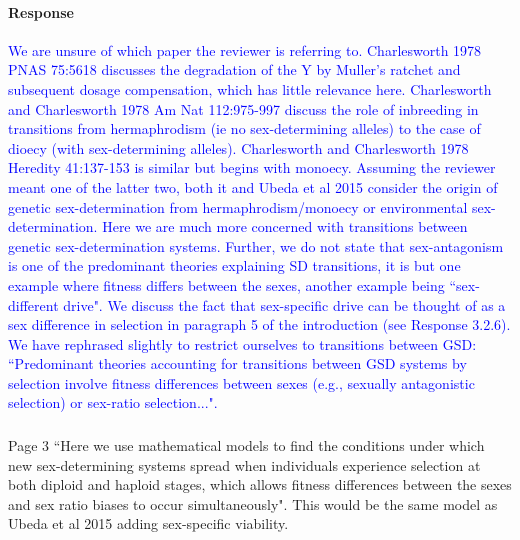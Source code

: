 \documentclass[10pt,letterpaper]{article}
\begin{document}
\noindent\paragraph{Response}
\textcolor{blue}{
We are unsure of which paper the reviewer is referring to.
Charlesworth 1978 PNAS 75:5618 discusses the degradation of the Y by Muller's ratchet and subsequent dosage compensation, which has little relevance here.
Charlesworth and Charlesworth 1978 Am Nat 112:975-997 discuss the role of inbreeding in transitions from hermaphrodism (ie no sex-determining alleles) to the case of dioecy (with sex-determining alleles). 
Charlesworth and Charlesworth 1978 Heredity 41:137-153 is similar but begins with monoecy.
Assuming the reviewer meant one of the latter two, both it and Ubeda et al 2015 consider the origin of genetic sex-determination from hermaphrodism/monoecy or environmental sex-determination. 
Here we are much more concerned with transitions between genetic sex-determination systems.
Further, we do not state that sex-antagonism is one of the predominant theories explaining SD transitions, it is but one example where fitness differs between the sexes, another example being ``sex-different drive". 
We discuss the fact that sex-specific drive can be thought of as a sex difference in selection in paragraph 5 of the introduction (see Response 3.2.6).
We have rephrased slightly to restrict ourselves to transitions between GSD: ``Predominant theories accounting for transitions between GSD systems by selection involve fitness differences between sexes (e.g., sexually antagonistic selection) or sex-ratio selection...".}

\noindent\subsubsection{}
Page 3 ``Here we use mathematical models to find the conditions under which new sex-determining systems spread when individuals experience selection at both diploid and haploid stages, which allows fitness differences between the sexes and sex ratio biases to occur simultaneously".
This would be the same model as Ubeda et al 2015 adding sex-specific viability.
\end{document}
